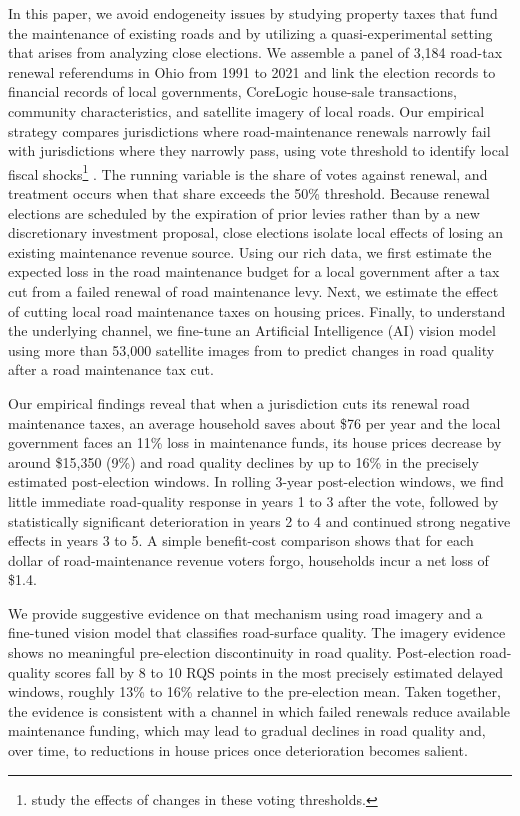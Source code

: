 In this paper, we avoid endogeneity issues by studying property taxes that fund the maintenance of existing roads and by utilizing a quasi-experimental setting that arises from analyzing close elections.
We assemble a panel of 3,184 road-tax renewal referendums in Ohio from 1991 to 2021 and link the election records to financial records of local governments, CoreLogic house-sale transactions, community characteristics, and satellite imagery of local roads. Our empirical strategy compares jurisdictions where road-maintenance renewals narrowly fail with jurisdictions where they narrowly pass, using vote threshold to identify local fiscal shocks\footnote{\cite{grosz2025relaxing} study the effects of changes in these voting thresholds.} \citep{cellini2010value, biasi_what_2025}. The running variable is the share of votes against renewal, and treatment occurs when that share exceeds the 50\% threshold. Because renewal elections are scheduled by the expiration of prior levies rather than by a new discretionary investment proposal, close elections isolate local effects of losing an existing maintenance revenue source. Using our rich data, we first estimate the expected loss in the road maintenance budget for a local government after a tax cut from a failed renewal of road maintenance levy. Next, we estimate the effect of cutting local road maintenance taxes on housing prices. Finally, to understand the underlying channel, we fine-tune an Artificial Intelligence (AI) vision model using more than 53,000 satellite images from \cite{brewer2021} to predict changes in road quality after a road maintenance tax cut.

Our empirical findings reveal that when a jurisdiction cuts its renewal road maintenance taxes, an average household saves about \$76 per year and the local government  faces an 11\% loss in maintenance funds, its house prices decrease by around \$15,350 (9\%) and road quality declines by up to 16\% in the precisely estimated post-election windows. In rolling 3-year post-election windows, we find little immediate road-quality response in years 1 to 3 after the vote, followed by statistically significant deterioration in years 2 to 4 and continued strong negative effects in years 3 to 5. A simple benefit-cost comparison shows that for each dollar of road-maintenance revenue voters forgo, households incur a net loss of \$1.4.





We provide suggestive evidence on that mechanism using road imagery and a fine-tuned vision model that classifies road-surface quality. The imagery evidence shows no meaningful pre-election discontinuity in road quality. Post-election road-quality scores fall by 8 to 10 RQS points in the most precisely estimated delayed windows, roughly 13\% to 16\% relative to the pre-election mean. Taken together, the evidence is consistent with a channel in which failed renewals reduce available maintenance funding, which may lead to gradual declines in road quality and, over time, to reductions in house prices once deterioration becomes salient.

